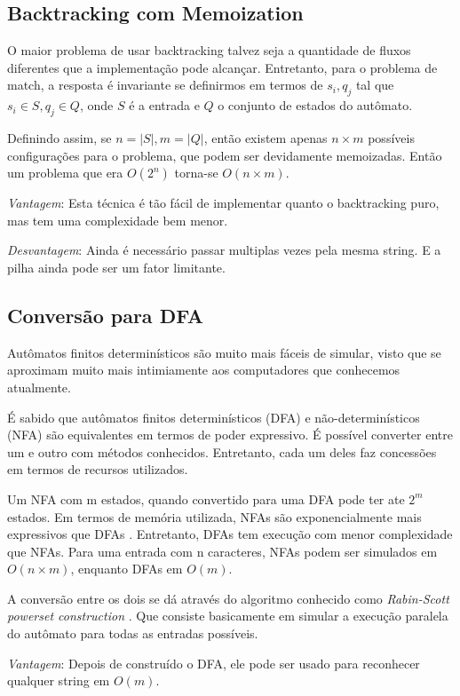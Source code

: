 \documentclass[a4paper,12pt,oneside,onecolumn]{uerj}
\begin{document}
\subsection{Backtracking com Memoization}

O maior problema de usar backtracking talvez seja a quantidade de fluxos diferentes que a implementação pode alcançar. Entretanto, para o problema de match, a resposta é invariante se definirmos em termos de $s_i, q_j$ tal que $s_i \in S, q_j \in Q$, onde $S$ é a entrada e $Q$ o conjunto de estados do autômato.

Definindo assim, se $n = |S|, m = |Q|$, então existem apenas $n \times m$ possíveis configurações para o problema, que podem ser devidamente memoizadas. Então um problema que era $O(2^n)$ torna-se $O(n\times m)$.

\emph{Vantagem}: Esta técnica é tão fácil de implementar quanto o backtracking puro, mas tem uma complexidade bem menor.

\emph{Desvantagem}: Ainda é necessário passar multiplas vezes pela mesma string. E a pilha ainda pode ser um fator limitante.

\subsection{Conversão para DFA}

Autômatos finitos determinísticos são muito mais fáceis de simular, visto que se aproximam muito mais intimiamente aos computadores que conhecemos atualmente. 

É sabido que autômatos finitos determinísticos (DFA) e não-determinísticos (NFA) são equivalentes em termos de poder expressivo. É possível converter entre um e outro com métodos conhecidos. Entretanto, cada um deles faz concessões em termos de recursos utilizados.

Um NFA com m estados, quando convertido para uma DFA pode ter ate $2^m$ estados. Em termos de memória utilizada, NFAs são exponencialmente mais expressivos que DFAs \cite{bib:Calabro05}. Entretanto, DFAs tem execução com menor complexidade que NFAs. Para uma entrada com n caracteres, NFAs podem ser simulados em $O(n \times m)$, enquanto DFAs em $O(m)$.

A conversão entre os dois se dá através do algoritmo conhecido como \emph{Rabin-Scott powerset construction} \cite{bib:Rabin59}. Que consiste basicamente em simular a execução paralela do autômato para todas as entradas possíveis.

\emph{Vantagem}: Depois de construído o DFA, ele pode ser usado para reconhecer qualquer string em $O(m)$.
\end{document}

